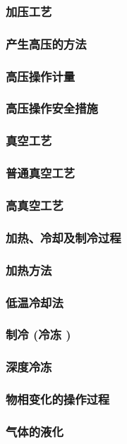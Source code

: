 \documentclass[UTF8]{../../ApplicationUniverse}
\begin{document}
\subsubsection{加压工艺}
    \subsubsection{产生高压的方法}
    \subsubsection{高压操作计量}
    \subsubsection{高压操作安全措施}
\subsubsection{真空工艺}
    \subsubsection{普通真空工艺}
    \subsubsection{高真空工艺}
\subsubsection{加热、冷却及制冷过程}
    \subsubsection{加热方法}
    \subsubsection{低温冷却法}
    \subsubsection{制冷 (冷冻 )}
    \subsubsection{深度冷冻}
\subsubsection{物相变化的操作过程}
    \subsubsection{气体的液化}
\end{document}
